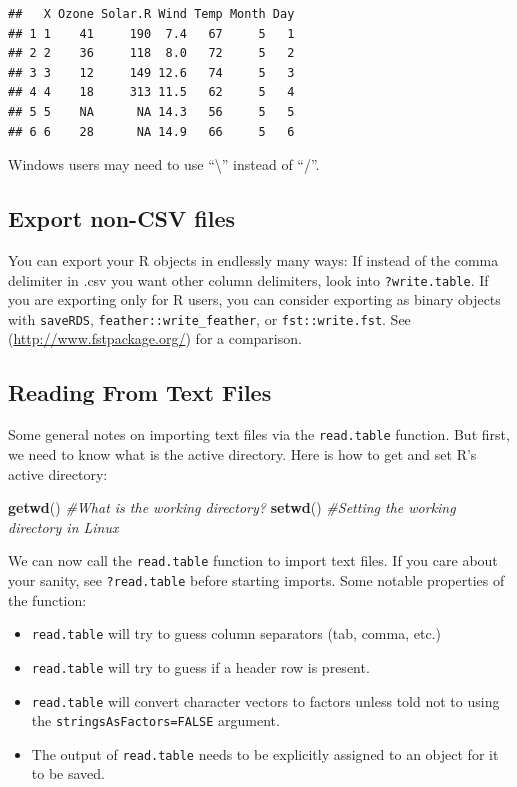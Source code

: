 \documentclass[]{book}
\newenvironment{Shaded}{\begin{snugshade}}{\end{snugshade}}
\newcommand{\CommentTok}[1]{\textcolor[rgb]{0.56,0.35,0.01}{\textit{#1}}}
\newcommand{\KeywordTok}[1]{\textcolor[rgb]{0.13,0.29,0.53}{\textbf{#1}}}
\newcommand{\NormalTok}[1]{#1}
\providecommand{\tightlist}{%
  \setlength{\itemsep}{0pt}\setlength{\parskip}{0pt}}
\theoremstyle{definition}
\theoremstyle{definition}
\theoremstyle{definition}
\theoremstyle{remark}
\let\BeginKnitrBlock\begin \let\EndKnitrBlock\end
\begin{document}
\begin{verbatim}
##   X Ozone Solar.R Wind Temp Month Day
## 1 1    41     190  7.4   67     5   1
## 2 2    36     118  8.0   72     5   2
## 3 3    12     149 12.6   74     5   3
## 4 4    18     313 11.5   62     5   4
## 5 5    NA      NA 14.3   56     5   5
## 6 6    28      NA 14.9   66     5   6
\end{verbatim}

\BeginKnitrBlock{remark}
{}Windows users may need to use ``\textbackslash{}'' instead of ``/''.
\EndKnitrBlock{remark}

\hypertarget{export-non-csv-files}{%
\subsection{Export non-CSV files}\label{export-non-csv-files}}

You can export your R objects in endlessly many ways:
If instead of the comma delimiter in .csv you want other column delimiters, look into \texttt{?write.table}.
If you are exporting only for R users, you can consider exporting as binary objects with \texttt{saveRDS}, \texttt{feather::write\_feather}, or \texttt{fst::write.fst}.
See (\url{http://www.fstpackage.org/}) for a comparison.

\hypertarget{reading-from-text-files}{%
\subsection{Reading From Text Files}\label{reading-from-text-files}}

Some general notes on importing text files via the \texttt{read.table} function.
But first, we need to know what is the active directory.
Here is how to get and set R's active directory:

\begin{Shaded}
\begin{Highlighting}[]
\KeywordTok{getwd}\NormalTok{() }\CommentTok{#What is the working directory?}
\KeywordTok{setwd}\NormalTok{() }\CommentTok{#Setting the working directory in Linux}
\end{Highlighting}
\end{Shaded}

We can now call the \texttt{read.table} function to import text files.
If you care about your sanity, see \texttt{?read.table} before starting imports.
Some notable properties of the function:

\begin{itemize}
\tightlist
\item
  \texttt{read.table} will try to guess column separators (tab, comma, etc.)
\item
  \texttt{read.table} will try to guess if a header row is present.
\item
  \texttt{read.table} will convert character vectors to factors unless told not to using the \texttt{stringsAsFactors=FALSE} argument.
\item
  The output of \texttt{read.table} needs to be explicitly assigned to an object for it to be saved.
\end{itemize}
\end{document}
